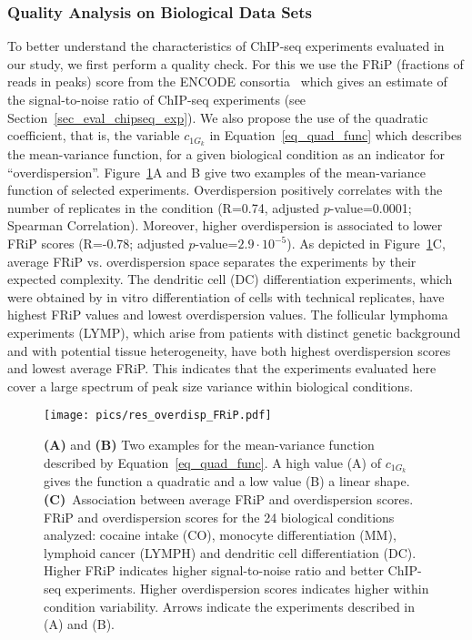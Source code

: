 \subsubsection{Quality Analysis on Biological Data Sets}
To better understand the characteristics of ChIP-seq experiments evaluated in our study, we first perform a quality check. 
For this we use the FRiP (fractions of reads in peaks) score from the ENCODE consortia~\citep{landt2012} which gives an estimate of the signal-to-noise ratio of ChIP-seq experiments (see Section~\ref{sec_eval_chipseq_exp}). 
We also propose the use of the quadratic coefficient, that is, the variable $c_{1G_k}$ in Equation~\ref{eq_quad_func} which describes the mean-variance function, for a given biological condition as an indicator for ``overdispersion''. 
Figure~\ref{fig_quality_check}A and B give two examples of the mean-variance function of selected experiments.
Overdispersion positively correlates with the number of replicates in the condition (R=0.74, adjusted $p$-value=0.0001; Spearman Correlation). 
Moreover, higher overdispersion is associated to lower FRiP scores (R=-0.78; adjusted $p$-value=$2.9 \cdot 10^{-5}$). 
As depicted in Figure~\ref{fig_quality_check}C, average FRiP vs. overdispersion space separates the experiments by their expected complexity. 
The dendritic cell (DC) differentiation experiments, which were obtained by in vitro differentiation of cells with technical replicates, have highest FRiP values and lowest overdispersion values. 
The follicular lymphoma experiments (LYMP), which arise from patients with distinct genetic background and with potential tissue heterogeneity, have both highest overdispersion scores and lowest average FRiP. 
This indicates that the experiments evaluated here cover a large spectrum of peak size variance within biological conditions.

\begin{figure}[ht]
  \begin{center}
    \texttt{[image: pics/res\_overdisp\_FRiP.pdf]}
  \end{center}
\caption[Mean-variance function examples and FRiP-overdispersion Association]{\textbf{(A)} and \textbf{(B)} Two examples for the mean-variance function described by Equation~\ref{eq_quad_func}. A high value (A) of $c_{1G_k}$ gives the function a quadratic and a low value (B) a linear shape. 
\textbf{(C)}~Association between average FRiP and overdispersion scores. 
FRiP and overdispersion scores for the 24 biological conditions analyzed: cocaine intake (CO), monocyte differentiation (MM), lymphoid cancer (LYMPH) and dendritic cell differentiation (DC). 
Higher FRiP indicates higher signal-to-noise ratio and better ChIP-seq experiments. 
Higher overdispersion scores indicates higher within condition variability. 
Arrows indicate the experiments described in (A) and (B).
}
\label{fig_quality_check}
\end{figure}

